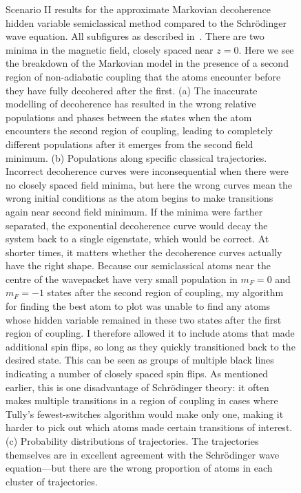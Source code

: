 {\begin{figure}
    \caption{Scenario II results for the approximate Markovian decoherence hidden variable semiclassical method compared to the Schr\"odinger wave equation. All subfigures as described in~. There are two minima in the magnetic field, closely spaced near $z=0$. Here we see the breakdown of the Markovian model in the presence of a second region of non-adiabatic coupling that the atoms encounter before they have fully decohered after the first. (a) The inaccurate modelling of decoherence has resulted in the wrong relative populations and phases between the states when the atom encounters the second region of coupling, leading to completely different populations after it emerges from the second field minimum. (b) Populations along specific classical trajectories. Incorrect decoherence curves were inconsequential when there were no closely spaced field minima, but here the wrong curves mean the wrong initial conditions as the atom begins to make transitions again near second field minimum. If the minima were farther separated, the exponential decoherence curve would decay the system back to a single eigenstate, which would be correct. At shorter times, it matters whether the decoherence curves actually have the right shape. Because our semiclassical atoms near the centre of the wavepacket have very small population in $m_F=0$ and $m_F=-1$ states after the second region of coupling, my algorithm for finding the best atom to plot was unable to find any atoms whose hidden variable remained in these two states after the first region of coupling. I therefore allowed it to include atoms that made additional spin flips, so long as they quickly transitioned back to the desired state. This can be seen as groups of multiple black lines indicating a number of closely spaced spin flips. As mentioned earlier, this is one disadvantage of Schr\"odinger theory: it often makes multiple transitions in a region of coupling in cases where Tully's fewest-switches algorithm would make only one, making it harder to pick out which atoms made certain transitions of interest. (c) Probability distributions of trajectories. The trajectories themselves are in excellent agreement with the Schr\"odinger wave equation---but there are the wrong proportion of atoms in each cluster of trajectories.}\label{fig:scenario_two_markovian}
\end{figure}
\restoregeometry}

